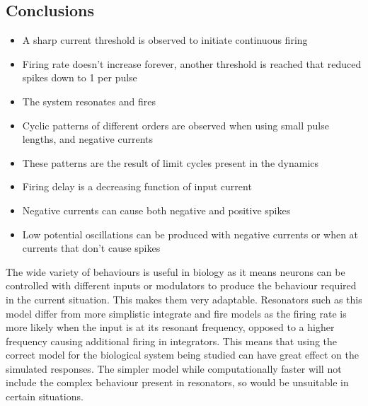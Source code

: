 \documentclass[twoside,twocolumn]{article}
\begin{document}
\subsection{Conclusions}
\begin{itemize}
\item A sharp current threshold is observed to initiate continuous firing
\item Firing rate doesn't increase forever, another threshold is reached that reduced spikes down to 1 per pulse
\item The system resonates and fires 
\item Cyclic patterns of different orders are observed when using small pulse lengths, and negative currents
\item These patterns are the result of limit cycles present in the dynamics
\item Firing delay is a decreasing function of input current
\item Negative currents can cause both negative and positive spikes
\item Low potential oscillations can be produced with negative currents or when at currents that don't cause spikes
\end{itemize}
The wide variety of behaviours is useful in biology as it means neurons can be controlled with different inputs or modulators to produce the behaviour required in the current situation. This makes them very adaptable.
\newline
Resonators such as this model differ from more simplistic integrate and fire models as the firing rate is more likely when the input is at its resonant frequency, opposed to a higher frequency causing additional firing in integrators. This means that using the correct model for the biological system being studied can have great effect on the simulated responses. The simpler model while computationally faster will not include the complex behaviour present in resonators, so would be unsuitable in certain situations.

\onecolumn
\end{document}
